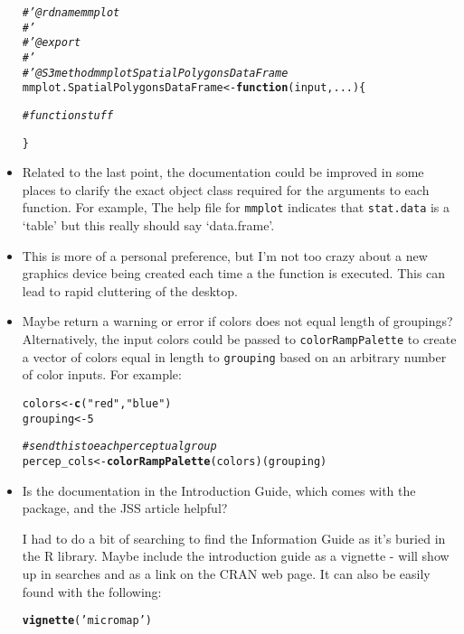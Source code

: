\documentclass[letterpaper,12pt]{article}\usepackage[]{graphicx}\usepackage[]{color}
\makeatletter
\newcommand{\hlnum}[1]{\textcolor[rgb]{0.686,0.059,0.569}{#1}}%
\newcommand{\hlstr}[1]{\textcolor[rgb]{0.192,0.494,0.8}{#1}}%
\newcommand{\hlcom}[1]{\textcolor[rgb]{0.678,0.584,0.686}{\textit{#1}}}%
\newcommand{\hlstd}[1]{\textcolor[rgb]{0.345,0.345,0.345}{#1}}%
\newcommand{\hlkwa}[1]{\textcolor[rgb]{0.161,0.373,0.58}{\textbf{#1}}}%
\newcommand{\hlkwb}[1]{\textcolor[rgb]{0.69,0.353,0.396}{#1}}%
\newcommand{\hlkwc}[1]{\textcolor[rgb]{0.333,0.667,0.333}{#1}}%
\newcommand{\hlkwd}[1]{\textcolor[rgb]{0.737,0.353,0.396}{\textbf{#1}}}%
\newenvironment{kframe}{%
 \def\at@end@of@kframe{}%
 \ifinner\ifhmode%
  \def\at@end@of@kframe{\end{minipage}}%
  \begin{minipage}{\columnwidth}%
 \fi\fi%
 \def\FrameCommand##1{\hskip\@totalleftmargin \hskip-\fboxsep
 \colorbox{shadecolor}{##1}\hskip-\fboxsep
     \hskip-\linewidth \hskip-\@totalleftmargin \hskip\columnwidth}%
 \MakeFramed {\advance\hsize-\width
   \@totalleftmargin\z@ \linewidth\hsize
   \@setminipage}}%
 {\par\unskip\endMakeFramed%
 \at@end@of@kframe}
\makeatother
\begin{document}
\begin{itemize}
\begin{kframe}
\begin{alltt}
\hlcom{#' @rdname mmplot}
\hlcom{#'}
\hlcom{#' @export}
\hlcom{#'}
\hlcom{#' @S3method mmplot SpatialPolygonsDataFrame}
\hlstd{mmplot.SpatialPolygonsDataFrame} \hlkwb{<-} \hlkwa{function}\hlstd{(}\hlkwc{input}\hlstd{,} \hlkwc{...}\hlstd{)\{}

  \hlcom{# function stuff}

\hlstd{\}}
\end{alltt}
\end{kframe}
\item Related to the last point, the documentation could be improved in some places to clarify the exact object class required for the arguments to each function.  For example, The help file for \texttt{mmplot} indicates that \texttt{stat.data} is a `table' but this really should say `data.frame'.
\item This is more of a personal preference, but I'm not too crazy about a new graphics device being created each time a the function is executed.  This can lead to rapid cluttering of the desktop.
\item Maybe return a warning or error if colors does not equal length of groupings?  Alternatively, the input colors could be passed to \texttt{colorRampPalette} to create a vector of colors equal in length to \texttt{grouping} based on an arbitrary number of color inputs.  For example:
\begin{kframe}
\begin{alltt}
\hlstd{colors} \hlkwb{<-} \hlkwd{c}\hlstd{(}\hlstr{"red"}\hlstd{,} \hlstr{"blue"}\hlstd{)}
\hlstd{grouping} \hlkwb{<-} \hlnum{5}

\hlcom{# send this to each perceptual group}
\hlstd{percep_cols} \hlkwb{<-} \hlkwd{colorRampPalette}\hlstd{(colors)(grouping)}
\end{alltt}
\end{kframe}

\item Is the documentation in the Introduction Guide, which comes with the package, and the JSS article helpful?

I had to do a bit of searching to find the Information Guide as it's buried in the R library.  Maybe include the introduction guide as a vignette - will show up in searches and as a link on the CRAN web page.  It can also be easily found with the following:
\begin{kframe}
\begin{alltt}
\hlkwd{vignette}\hlstd{(}\hlstr{'micromap'}\hlstd{)}
\end{alltt}
\end{kframe}


\end{itemize}
\end{document}

